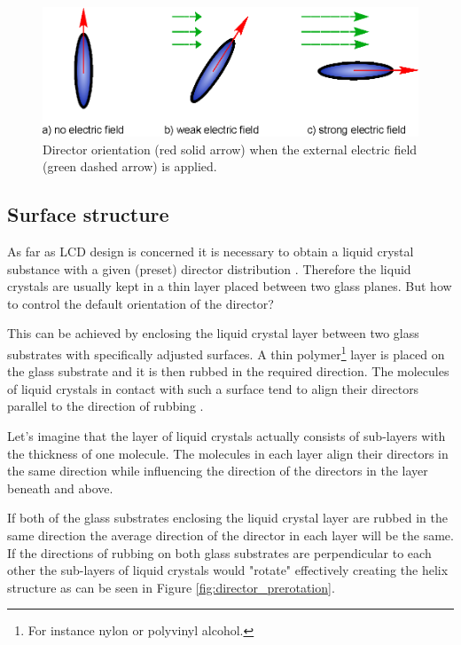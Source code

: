 \begin{figure}[hbt]
\centering
\includegraphics[width=12cm]{img/director.eps}
\caption{Director orientation (red solid arrow) when the external electric field (green dashed arrow) is applied.}
\label{fig:director}
\end{figure}

\subsection{Surface structure} \label{txt:surface_structure}
As far as LCD design is concerned it is necessary to obtain a liquid crystal substance with a given (preset) director distribution \cite{Desimpel2006LCD}. Therefore the liquid crystals are usually kept in a thin layer placed between two glass planes. But how to control the default orientation of the director?

This can be achieved by enclosing the liquid crystal layer between two glass substrates with specifically adjusted surfaces. A thin polymer\footnote{For instance nylon or polyvinyl alcohol.} layer is placed on the glass substrate and it is then rubbed in the required direction. The molecules of liquid crystals in contact with such a surface tend to align their directors parallel to the direction of rubbing \cite{DesimpelLCandPhoytonics}.

Let's imagine that the layer of liquid crystals actually consists of sub-layers with the thickness of one molecule. The molecules in each layer align their directors in the same direction while influencing the direction of the directors in the layer beneath and above. 

If both of the glass substrates enclosing the liquid crystal layer are rubbed in the same direction the average direction of the director in each layer will be the same. If the directions of rubbing on both glass substrates are perpendicular to each other the sub-layers of liquid crystals would "rotate" effectively creating the helix structure as can be seen in Figure \ref{fig:director_prerotation}. 

